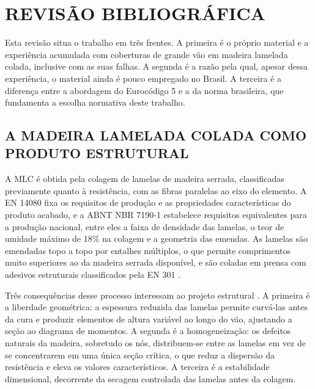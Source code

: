 
\chapter{REVISÃO BIBLIOGRÁFICA}\label{cap:revisao}

Esta revisão situa o trabalho em três frentes. A primeira é o próprio material e
a experiência acumulada com coberturas de grande vão em madeira lamelada colada,
inclusive com as suas falhas. A segunda é a razão pela qual, apesar dessa
experiência, o material ainda é pouco empregado no Brasil. A terceira é a
diferença entre a abordagem do Eurocódigo 5 e a da norma brasileira, que
fundamenta a escolha normativa deste trabalho.

\section{A MADEIRA LAMELADA COLADA COMO PRODUTO ESTRUTURAL}\label{sec:mlc-produto}

A MLC é obtida pela colagem de lamelas de madeira serrada, classificadas
previamente quanto à resistência, com as fibras paralelas ao eixo do elemento.
A EN 14080 \cite{EN14080:2013} fixa os requisitos de produção e as propriedades
características do produto acabado, e a ABNT NBR 7190-1 \cite{NBR7190-1:2022}
estabelece requisitos equivalentes para a produção nacional, entre eles a faixa
de densidade das lamelas, o teor de umidade máximo de 18\% na colagem e a
geometria das emendas. As lamelas são emendadas topo a topo por entalhes
múltiplos, o que permite comprimentos muito superiores ao da madeira serrada
disponível, e são coladas em prensa com adesivos estruturais classificados pela
EN 301 \cite{EN301:2017}.

Três consequências desse processo interessam ao projeto estrutural
\cite{thelandersson:2003, porteous:2013}. A primeira é a liberdade geométrica: a
espessura reduzida das lamelas permite curvá-las antes da cura e produzir
elementos de altura variável ao longo do vão, ajustando a seção ao diagrama de
momentos. A segunda é a homogeneização: os defeitos naturais da madeira,
sobretudo os nós, distribuem-se entre as lamelas em vez de se concentrarem em
uma única seção crítica, o que reduz a dispersão da resistência e eleva os
valores característicos. A terceira é a estabilidade dimensional, decorrente da
secagem controlada das lamelas antes da colagem.

